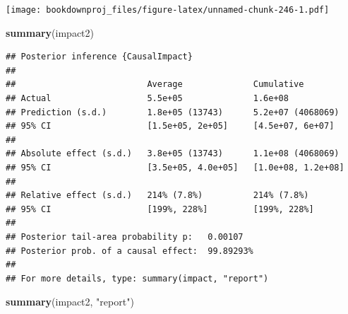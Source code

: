 \documentclass[
]{article}
\newenvironment{Shaded}{\begin{snugshade}}{\end{snugshade}}
\newcommand{\KeywordTok}[1]{\textcolor[rgb]{0.13,0.29,0.53}{\textbf{#1}}}
\newcommand{\NormalTok}[1]{#1}
\newcommand{\StringTok}[1]{\textcolor[rgb]{0.31,0.60,0.02}{#1}}
\begin{document}
\texttt{[image: bookdownproj\_files/figure-latex/unnamed-chunk-246-1.pdf]}

\begin{Shaded}
\begin{Highlighting}[]
\KeywordTok{summary}\NormalTok{(impact2)}
\end{Highlighting}
\end{Shaded}

\begin{verbatim}
## Posterior inference {CausalImpact}
## 
##                          Average              Cumulative        
## Actual                   5.5e+05              1.6e+08           
## Prediction (s.d.)        1.8e+05 (13743)      5.2e+07 (4068069) 
## 95% CI                   [1.5e+05, 2e+05]     [4.5e+07, 6e+07]  
##                                                                 
## Absolute effect (s.d.)   3.8e+05 (13743)      1.1e+08 (4068069) 
## 95% CI                   [3.5e+05, 4.0e+05]   [1.0e+08, 1.2e+08]
##                                                                 
## Relative effect (s.d.)   214% (7.8%)          214% (7.8%)       
## 95% CI                   [199%, 228%]         [199%, 228%]      
## 
## Posterior tail-area probability p:   0.00107
## Posterior prob. of a causal effect:  99.89293%
## 
## For more details, type: summary(impact, "report")
\end{verbatim}

\begin{Shaded}
\begin{Highlighting}[]
\KeywordTok{summary}\NormalTok{(impact2, }\StringTok{"report"}\NormalTok{)}
\end{Highlighting}
\end{Shaded}
\end{document}

